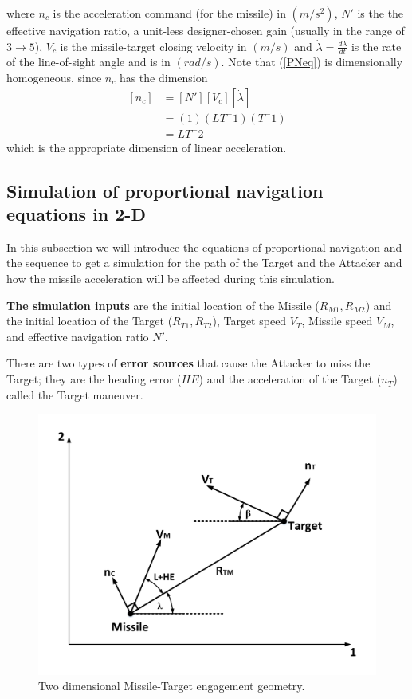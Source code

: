 where $n_c$ is the acceleration command (for the missile) in $(m/s^2)$, $N'$ is the the effective navigation ratio, a unit-less designer-chosen gain (usually in the range of $3 \to 5$), $V_c$ is the missile-target closing velocity in $(m/s)$ and $\dot{\lambda} = \frac{d\lambda}{dt}$ is the rate of the line-of-sight angle and is in $(rad/s)$. Note that (\ref{PNeq}) is dimensionally homogeneous, since $n_c$ has the dimension
\begin{equation}
	\begin{split}
	[n_c] &= [N'] [V_c] [\dot{\lambda}]\\
	&=(1) (LT^-1) (T^-1)\\
	&=LT^-2
	\end{split}
	\label{PN dimensionallity}
\end{equation}
which is the appropriate dimension of linear acceleration.

\subsection{Simulation of proportional navigation equations in 2-D}
In this subsection we will introduce the equations of proportional navigation and the sequence to get a simulation for the path of the Target and the Attacker and how the missile acceleration will be affected during this simulation.

\textbf{The simulation inputs} are the initial location of the Missile ($R_{M1}, R_{M2}$) and the initial location of the Target ($R_{T1}, R_{T2}$), Target speed $V_T$, Missile speed $V_M$, and effective navigation ratio $N'$.

There are two types of \textbf{error sources} that cause the Attacker to miss the Target; they are the heading error ($HE$) and the acceleration of the Target ($n_T$) called the Target maneuver.

\begin{figure}[htb]
	\centering
	\includegraphics[scale = 0.65]{fig/PN.pdf}
	\caption{Two dimensional Missile-Target engagement geometry.}
	\label{PN}
\end{figure}


